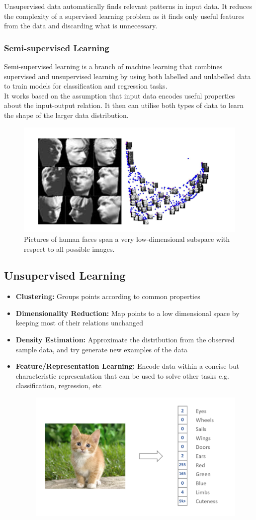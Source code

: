 Unsupervised data automatically finds relevant patterns in input data. It reduces the complexity of a supervised learning problem as it finds only useful features from the data and discarding what is unnecessary. 

\subsubsection{Semi-supervised Learning}
Semi-supervised learning is a branch of machine learning that combines supervised and unsupervised learning by using both labelled and unlabelled data to train models for classification and regression tasks.\\

It works based on the assumption that input data encodes useful properties about the input-output relation. It then can utilise both types of data to learn the shape of the larger data distribution.

\begin{figure}[H]
    \centering
    \includegraphics[width=0.5\linewidth]{img/image_face_dist.png}
    \caption{Pictures of human faces span a very low-dimensional subspace with respect to all possible images.}
\end{figure}

\subsection{Unsupervised Learning}
\begin{itemize}
    \item \textbf{Clustering: } Groups points according to common properties
    \item \textbf{Dimensionality Reduction: } Map points to a low dimensional space by keeping most of their relations unchanged
    \item \textbf{Density Estimation: } Approximate the distribution from the observed sample data, and try generate new examples of the data
    \item \textbf{Feature/Representation Learning: } Encode data within a concise but characteristic representation that can be used to solve other tasks e.g. classification, regression, etc
    \begin{figure}[H]
        \centering
        \includegraphics[width=0.5\linewidth]{img/cat_learning.png} 
    \end{figure}
\end{itemize}


